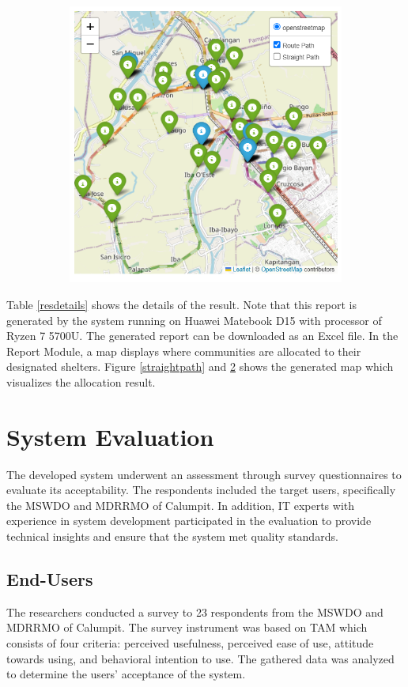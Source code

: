 \begin{figure}[h!]
\begin{subfigure}{0.4\textwidth}
			\includegraphics[width=\textwidth]{Chapter 4/route path}
			\label{routepath}
		\end{subfigure}
		
	\end{figure}
	
	 Table \ref{resdetails} shows the details of the result. Note that this report is generated by the system running on Huawei Matebook D15 with processor of Ryzen 7 5700U. The generated report can be downloaded as an Excel file. In the Report Module, a map displays where communities are allocated to their designated shelters. Figure \ref{straightpath} and \ref{routepath} shows the generated map which visualizes the allocation result.
	
\section{System Evaluation}
	The developed system underwent an assessment through survey questionnaires to evaluate its acceptability. The respondents included the target users, specifically the MSWDO and MDRRMO of Calumpit. In addition, IT experts with experience in system development participated in the evaluation to provide technical insights and ensure that the system met quality standards.

\subsection{End-Users}
	The researchers conducted a survey to 23 respondents from the MSWDO and MDRRMO of Calumpit. The survey instrument was based on TAM which consists of four criteria: perceived usefulness, perceived ease of use, attitude towards using, and behavioral intention to use. The gathered data was analyzed to determine the users’ acceptance of the system. 


